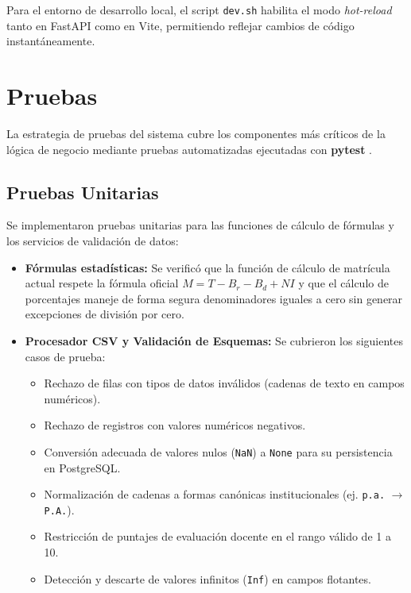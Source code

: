Para el entorno de desarrollo local, el script \texttt{dev.sh} habilita el modo \textit{hot-reload} tanto en FastAPI como en Vite, permitiendo reflejar cambios de código instantáneamente.

\section{Pruebas}

La estrategia de pruebas del sistema cubre los componentes más críticos de la lógica de negocio mediante pruebas automatizadas ejecutadas con \textbf{pytest} \cite{myers2011, pressman2020}.

\subsection{Pruebas Unitarias}

Se implementaron pruebas unitarias para las funciones de cálculo de fórmulas y los servicios de validación de datos:

\begin{itemize}
    \item \textbf{Fórmulas estadísticas:} Se verificó que la función de cálculo de matrícula actual respete la fórmula oficial $M = T - B_r - B_d + NI$ y que el cálculo de porcentajes maneje de forma segura denominadores iguales a cero sin generar excepciones de división por cero.

    \item \textbf{Procesador CSV y Validación de Esquemas:} Se cubrieron los siguientes casos de prueba:
    \begin{itemize}
        \item Rechazo de filas con tipos de datos inválidos (cadenas de texto en campos numéricos).
        \item Rechazo de registros con valores numéricos negativos.
        \item Conversión adecuada de valores nulos (\texttt{NaN}) a \texttt{None} para su persistencia en PostgreSQL.
        \item Normalización de cadenas a formas canónicas institucionales (ej. \texttt{p.a.} $\rightarrow$ \texttt{P.A.}).
        \item Restricción de puntajes de evaluación docente en el rango válido de 1 a 10.
        \item Detección y descarte de valores infinitos (\texttt{Inf}) en campos flotantes.
    \end{itemize}
\end{itemize}

